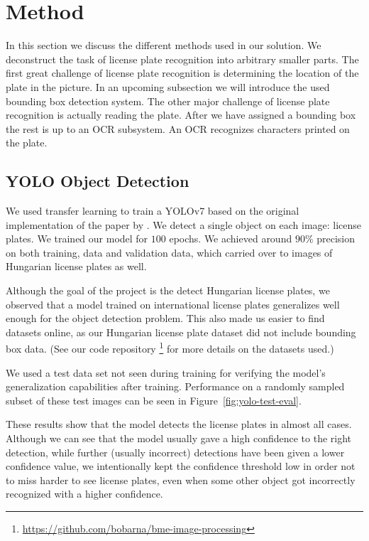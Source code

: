 \section{Method}
\label{method}
In this section we discuss the different methods used in our solution.  We
deconstruct the task of license plate recognition into arbitrary smaller parts.
The first great challenge of license plate recognition is determining the
location of the plate in the picture.  In an upcoming subsection we will
introduce the used bounding box detection system.  The other major challenge of
license plate recognition is actually reading the plate.  After we have assigned
a bounding box the rest is up to an \ac{OCR} subsystem.  An \ac{OCR} recognizes
characters printed on the plate.

\subsection{YOLO Object Detection}
We used transfer learning to train a YOLOv7 based on the original implementation
of the paper by \cite{yolov7}. We detect a single object on each image: license
plates. We trained our model for $100$ epochs. We achieved around $90\%$
precision on both training, data and validation data, which carried over to
images of Hungarian license plates as well.

Although the goal of the project is the detect Hungarian license plates, we
observed that a model trained on international license plates generalizes well
enough for the object detection problem. This also made us easier to find
datasets online, as our Hungarian license plate dataset did not include bounding
box data. (See our code repository
\footnote{\url{https://github.com/bobarna/bme-image-processing}} for more
details on the datasets used.)

We used a test data set not seen during training for verifying the model's
generalization capabilities after training. Performance on a randomly sampled
subset of these test images can be seen in Figure~\ref{fig:yolo-test-eval}.

These results show that the model detects the license plates in almost all
cases. Although we can see that the model usually gave a high confidence to the
right detection, while further (usually incorrect) detections have been given
a lower confidence value, we intentionally kept the confidence threshold low in
order not to miss harder to see license plates, even when some other object got
incorrectly recognized with a higher confidence.

